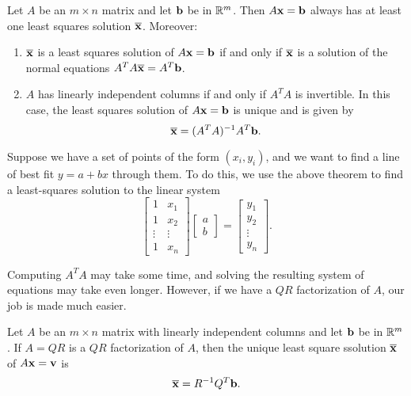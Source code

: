 \documentclass[../m073main.tex]{subfiles}
\begin{document}
\begin{theorem}
	Let $A$ be an $m \times n$ matrix and let $\mathbf{b}$ be in $\mathbb{R}^m$.
	Then $A \mathbf{x} = \mathbf{b}$ always has at least one least squares solution $\overline{\mathbf{x}}$.
	Moreover:
	\begin{enumerate}[label=(\alph*)]
		\item $\overline{\mathbf{x}}$ is a least squares solution of $A \mathbf{x} = \mathbf{b}$ if and only if $\overline{\mathbf{x}}$ is a solution of the normal equations $A^TA \overline{\mathbf{x}} = A^T \mathbf{b}$.
		\item $A$ has linearly independent columns if and only if $A^TA$ is invertible.
			  In this case, the least squares solution of $A \mathbf{x} = \mathbf{b}$ is unique and is given by
			  \[ \overline{\mathbf{x}} = (A^TA)^{-1}A^T \mathbf{b}. \]
	\end{enumerate}
\end{theorem}

Suppose we have a set of points of the form $(x_i, y_i)$, and we want to find a line of best fit $y = a + bx$ through them.
To do this, we use the above theorem to find a least-squares solution to the linear system
\[ \begin{bmatrix} 1 & x_1 \\ 1 & x_2 \\ \vdots & \vdots \\ 1 & x_n \end{bmatrix} \begin{bmatrix} a \\ b \end{bmatrix} = \begin{bmatrix} y_1 \\ y_2 \\ \vdots \\ y_n \end{bmatrix}. \]

Computing $A^T A$ may take some time, and solving the resulting system of equations may take even longer.
However, if we have a $QR$ factorization of $A$, our job is made much easier.

\begin{theorem}
	Let $A$ be an $m \times n$ matrix with linearly independent columns and let $\mathbf{b}$ be in $\mathbb{R}^m$.
	If $A = QR$ is a $QR$ factorization of $A$, then the unique least square ssolution $\overline{\mathbf{x}}$ of $A \mathbf{x} = \mathbf{v}$ is
	\[ \overline{\mathbf{x}} = R^{-1} Q^T \mathbf{b}. \]
\end{theorem}
\end{document}
